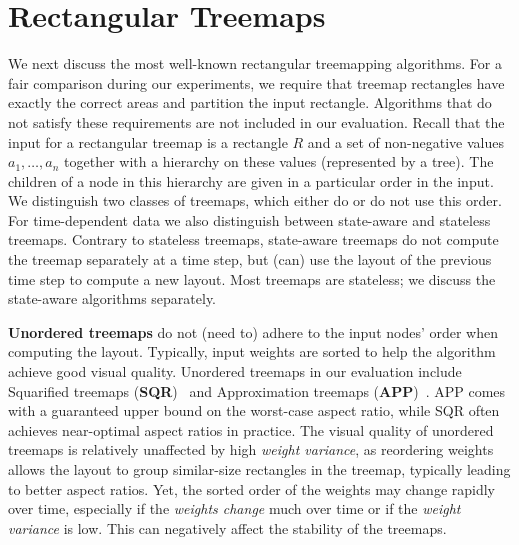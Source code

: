 \section{Rectangular Treemaps}
\label{sec:algorithms-2}
We next discuss the most well-known rectangular treemapping algorithms. For a fair comparison during our experiments, we require that treemap rectangles have exactly the correct areas and partition the input rectangle. Algorithms that do not satisfy these requirements are not included in our evaluation. 
%
 Recall that the input for a rectangular treemap is a rectangle $R$ and a set of non-negative values $a_1, \ldots, a_n$ together with a hierarchy on these values (represented by a tree). The children of a node in this hierarchy are given in a particular order in the input. We distinguish two classes of treemaps, which either do or do not use this order. For time-dependent data we also distinguish between state-aware and stateless treemaps. Contrary to stateless treemaps, state-aware treemaps do not compute the treemap separately at a time step, but (can) use the layout of the previous time step to compute a new layout. Most treemaps are stateless; we discuss the state-aware algorithms separately. 

\smallskip\noindent
\textbf{Unordered treemaps} do not (need to) adhere to the input nodes' order when computing the layout. Typically, input weights are sorted to help the algorithm achieve good visual quality. Unordered treemaps in our evaluation include Squarified treemaps (\textbf{SQR})~\citep{sqr} and Approximation treemaps (\textbf{APP})~\citep{nagamochi07}. APP comes with a guaranteed upper bound on the worst-case aspect ratio, while SQR often achieves near-optimal aspect ratios in practice.
%
The visual quality of unordered treemaps is relatively unaffected by high \emph{weight variance}, as reordering weights allows the layout to group similar-size rectangles in the treemap, typically leading to better aspect ratios. Yet, the sorted order of the weights may change rapidly over time, especially if the \emph{weights change} much over time or if the \emph{weight variance} is low. This can negatively affect the stability of the treemaps. 

